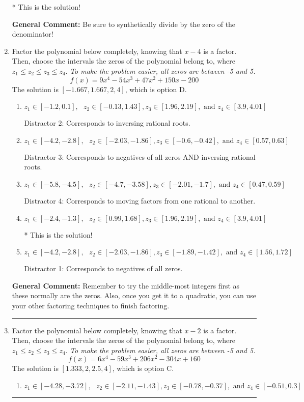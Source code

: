 \documentclass{extbook}[14pt]
\newcommand{\litem}[1]{\item #1

\rule{\textwidth}{0.4pt}}
\begin{document}
\begin{enumerate}
{\begin{enumerate}[label=\Alph*.]
* This is the solution!
\end{enumerate}

\textbf{General Comment:} Be sure to synthetically divide by the zero of the denominator!
}
\litem{
Factor the polynomial below completely, knowing that $x -4$ is a factor. Then, choose the intervals the zeros of the polynomial belong to, where $z_1 \leq z_2 \leq z_3 \leq z_4$. \textit{To make the problem easier, all zeros are between -5 and 5.}
\[ f(x) = 9x^{4} -54 x^{3} +47 x^{2} +150 x -200 \]The solution is \( [-1.667, 1.667, 2, 4] \), which is option D.\begin{enumerate}[label=\Alph*.]
\item \( z_1 \in [-1.2, 0.1], \text{   }  z_2 \in [-0.13, 1.43], z_3 \in [1.96, 2.19], \text{   and   } z_4 \in [3.9, 4.01] \)

 Distractor 2: Corresponds to inversing rational roots.
\item \( z_1 \in [-4.2, -2.8], \text{   }  z_2 \in [-2.03, -1.86], z_3 \in [-0.6, -0.42], \text{   and   } z_4 \in [0.57, 0.63] \)

 Distractor 3: Corresponds to negatives of all zeros AND inversing rational roots.
\item \( z_1 \in [-5.8, -4.5], \text{   }  z_2 \in [-4.7, -3.58], z_3 \in [-2.01, -1.7], \text{   and   } z_4 \in [0.47, 0.59] \)

 Distractor 4: Corresponds to moving factors from one rational to another.
\item \( z_1 \in [-2.4, -1.3], \text{   }  z_2 \in [0.99, 1.68], z_3 \in [1.96, 2.19], \text{   and   } z_4 \in [3.9, 4.01] \)

* This is the solution!
\item \( z_1 \in [-4.2, -2.8], \text{   }  z_2 \in [-2.03, -1.86], z_3 \in [-1.89, -1.42], \text{   and   } z_4 \in [1.56, 1.72] \)

 Distractor 1: Corresponds to negatives of all zeros.
\end{enumerate}

\textbf{General Comment:} Remember to try the middle-most integers first as these normally are the zeros. Also, once you get it to a quadratic, you can use your other factoring techniques to finish factoring.
}
\litem{
Factor the polynomial below completely, knowing that $x -2$ is a factor. Then, choose the intervals the zeros of the polynomial belong to, where $z_1 \leq z_2 \leq z_3 \leq z_4$. \textit{To make the problem easier, all zeros are between -5 and 5.}
\[ f(x) = 6x^{4} -59 x^{3} +206 x^{2} -304 x + 160 \]The solution is \( [1.333, 2, 2.5, 4] \), which is option C.\begin{enumerate}[label=\Alph*.]
\item \( z_1 \in [-4.28, -3.72], \text{   }  z_2 \in [-2.11, -1.43], z_3 \in [-0.78, -0.37], \text{   and   } z_4 \in [-0.51, 0.3] \)


\end{enumerate}}
\end{enumerate}
\end{document}
